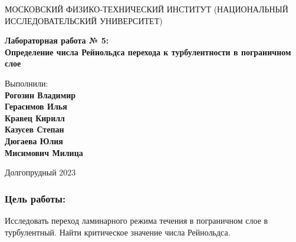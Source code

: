 \documentclass[12pt,a4paper]{article}
\begin{document}
\begin{titlepage}
\begin{center}
    {\large МОСКОВСКИЙ ФИЗИКО-ТЕХНИЧЕСКИЙ ИНСТИТУТ (НАЦИОНАЛЬНЫЙ ИССЛЕДОВАТЕЛЬСКИЙ УНИВЕРСИТЕТ)}
\end{center}
\vspace{5.5cm}
{\huge
\begin{center}
    {\bf Лабораторная работа № 5:\\
    Определение числа Рейнольдса перехода к турбулентности в пограничном слое}
\end{center}
}
\vspace{7cm}
\begin{flushright}
{\large{ Выполнили: \\ \textbf{Рогозин Владимир \\
                        Герасимов Илья \\ 
                        Кравец Кирилл  \\
                        Казусев Степан \\
                        Дюгаева Юлия \\
                        Мисимович Милица \\
                        }
                    }
                }
                        
\end{flushright}
\vspace{1 cm}
\begin{center}
    Долгопрудный 2023
\end{center}
\end{titlepage}
\subsubsection*{Цель работы:}
Исследовать переход ламинарного режима течения в пограничном слое в турбулентный. Найти критическое значение числа Рейнольдса.
\end{document}
